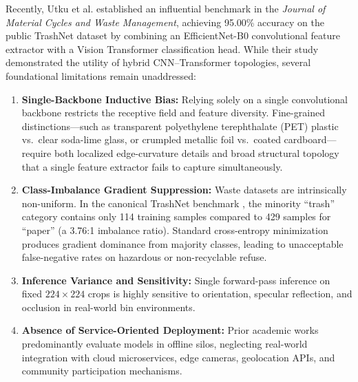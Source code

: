 \documentclass[11pt,a4paper]{article}
\begin{document}
Recently, Utku et al. \cite{utku2026} established an influential benchmark in the \textit{Journal of Material Cycles and Waste Management}, achieving 95.00\% accuracy on the public TrashNet dataset by combining an EfficientNet-B0 convolutional feature extractor \cite{tan2019} with a Vision Transformer classification head. While their study demonstrated the utility of hybrid CNN--Transformer topologies, several foundational limitations remain unaddressed:
\begin{enumerate}[leftmargin=*]
  \item \textbf{Single-Backbone Inductive Bias:} Relying solely on a single convolutional backbone restricts the receptive field and feature diversity. Fine-grained distinctions—such as transparent polyethylene terephthalate (PET) plastic vs.\ clear soda-lime glass, or crumpled metallic foil vs.\ coated cardboard—require both localized edge-curvature details and broad structural topology that a single feature extractor fails to capture simultaneously.
  \item \textbf{Class-Imbalance Gradient Suppression:} Waste datasets are intrinsically non-uniform. In the canonical TrashNet benchmark \cite{thung2016}, the minority ``trash'' category contains only 114 training samples compared to 429 samples for ``paper'' (a 3.76:1 imbalance ratio). Standard cross-entropy minimization produces gradient dominance from majority classes, leading to unacceptable false-negative rates on hazardous or non-recyclable refuse.
  \item \textbf{Inference Variance and Sensitivity:} Single forward-pass inference on fixed $224\times224$ crops is highly sensitive to orientation, specular reflection, and occlusion in real-world bin environments.
  \item \textbf{Absence of Service-Oriented Deployment:} Prior academic works predominantly evaluate models in offline silos, neglecting real-world integration with cloud microservices, edge cameras, geolocation APIs, and community participation mechanisms.
\end{enumerate}
\end{document}
